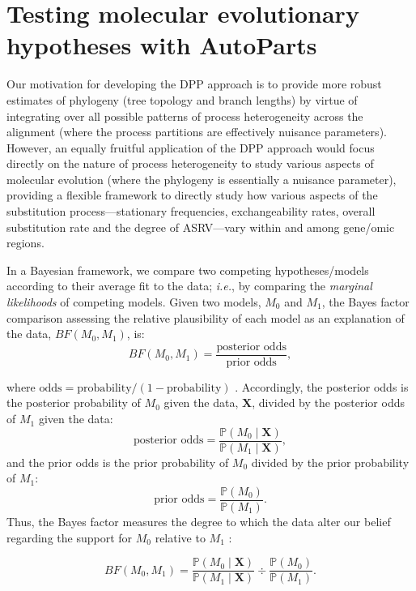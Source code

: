 \documentclass[11pt]{article}
\begin{document}
\bigskip
\section*{Testing molecular evolutionary hypotheses with AutoParts}

Our motivation for developing the DPP approach is to provide more robust estimates of phylogeny (tree topology and branch lengths) by virtue of integrating over all possible patterns of process heterogeneity across the alignment (where the process partitions are effectively nuisance parameters). 
However, an equally fruitful application of the DPP approach would focus directly on the nature of process heterogeneity to study various aspects of molecular evolution (where the phylogeny is essentially a nuisance parameter), providing a flexible framework to directly study how various aspects of the substitution process---stationary frequencies, exchangeability rates, overall substitution rate and the degree of ASRV---vary within and among gene/omic regions.

In a Bayesian framework, we compare two competing hypotheses/models according to their average fit to the data; {\it i.e.}, by comparing the \emph{marginal likelihoods} of competing models.
Given two models, $M_0$ and $M_1$, the Bayes factor comparison assessing the relative plausibility of each model as an explanation of the data, $BF(M_0,M_1)$, is:
$$
BF(M_0,M_1) = \frac{\mbox{posterior odds}}{\mbox{prior odds}},
$$

where $\mbox{odds} = \mbox{probability} / (1-\mbox{probability})$ \citep{kass95}. 
Accordingly, the posterior odds is the posterior probability of $M_0$ given the data, $\mathbf X$, divided by the posterior odds of $M_1$ given the data:
$$
\mbox{posterior odds} = \frac{\mathbb{P}(M_0 \mid \mathbf X)}{\mathbb{P}(M_1 \mid \mathbf X)},
$$
and the prior odds is the prior probability of $M_0$ divided by the prior probability of $M_1$:
$$
\mbox{prior odds} = \frac{\mathbb{P}(M_0)}{\mathbb{P}(M_1)}.
$$
Thus, the Bayes factor measures the degree to which the data alter our belief regarding the support for $M_0$ relative to $M_1$ \citep{lavine99}:

$$
BF(M_0,M_1) = \frac{\mathbb{P}(M_0 \mid \mathbf X)}{\mathbb{P}(M_1 \mid \mathbf X)} \div \frac{\mathbb{P}(M_0)}{\mathbb{P}(M_1)}. 
$$
\end{document}
